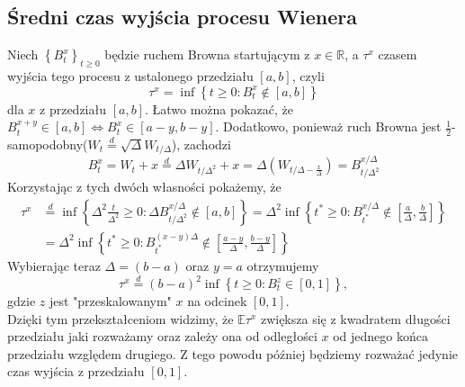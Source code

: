 \documentclass[12pt]{mwart}
\begin{document}
	\subsection{Średni czas wyjścia procesu Wienera}
	\noindent Niech $\left\{B^x_t\right\}_{t\geqslant0}$ będzie ruchem Browna startującym z $x\in\mathbb{R}$, a $\tau^x$ czasem wyjścia tego procesu z ustalonego przedziału $[a, b]$, czyli
	\begin{equation}
		\tau^x=\inf\left\{t\geqslant0:B^x_t\notin[a, b]\right\}
	\end{equation}
	\noindent dla $x$ z przedziału $[a,b]$. Łatwo można pokazać, że $B^{x+y}_t\in[a ,b] \iff B^x_t\in[a-y, b-y]$.
	Dodatkowo, ponieważ ruch Browna jest $\frac{1}{2}$-samopodobny($W_t\overset{d}{=}\sqrt{\Delta}W_{t/\Delta}$), zachodzi
	\begin{equation}
		B^x_t=W_t+x\overset{d}{=}\Delta W_{t/\Delta^2}+x = \Delta\left(W_{t/\Delta-\frac{x}{\Delta}}\right)=B^{x/\Delta}_{t/\Delta^2}
	\end{equation}
	Korzystając z tych dwóch własności pokażemy, że
	\begin{equation}
		\begin{split}
			\tau^x&\overset{d}{=}\inf\left\{\Delta^2\frac{t}{\Delta^2}\geqslant0:\Delta B^{x/\Delta}_{t/\Delta^2}\notin[a, b]\right\} =\Delta^2\inf\left\{t^*\geqslant0:B^{x/\Delta}_{t^*}\notin\left[\frac{a}{\Delta},\frac{b}{\Delta}\right]\right\}\\
			&=\Delta^2\inf\left\{t^*\geqslant0:B^{(x-y)\Delta}_{t^*}\notin\left[\frac{a-y}{\Delta},\frac{b-y}{\Delta}\right]\right\}
		\end{split}
	\end{equation}
	Wybierając teraz $\Delta=(b-a)$ oraz $y=a$ otrzymujemy
	\begin{equation}\label{eq:tau_przeskalowane}
		\tau^x\overset{d}{=}(b-a)^2\inf\left\{t\geqslant0:B^z_t\in[0,1]\right\},
	\end{equation}
	gdzie $z$ jest "przeskalowanym" $x$ na odcinek $[0, 1]$.\\
	Dzięki tym przekształceniom widzimy, że $\mathbb{E}\tau^x$ zwiększa się z kwadratem długości przedziału jaki rozważamy oraz zależy ona od odległości $x$ od jednego końca przedziału względem drugiego. Z tego powodu później będziemy rozważać jedynie czas wyjścia z przedziału $[0, 1]$.
	
\end{document}
